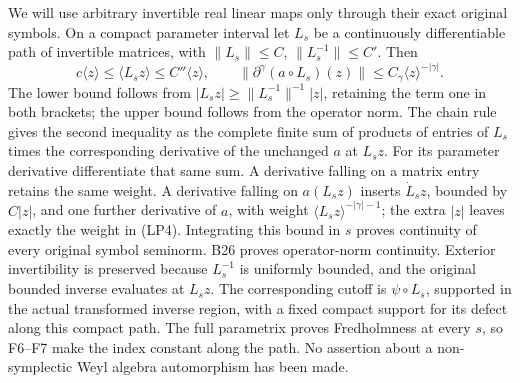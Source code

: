 \documentclass[
  11pt,
]{article}
\begin{document}
We will use arbitrary invertible real linear maps only through their
exact original symbols. On a compact parameter interval let \(L_s\) be a
continuously differentiable path of invertible matrices, with
\(\|L_s\|\le C\), \(\|L_s^{-1}\|\le C'\). Then \[
 c\langle z\rangle\le\langle L_sz\rangle\le C''\langle z\rangle,
 \qquad
 \|\partial^\gamma(a\circ L_s)(z)\|
       \le C_\gamma\langle z\rangle^{-|\gamma|}.
 \tag{LP4}
\] The lower bound follows from \(|L_sz|\ge\|L_s^{-1}\|^{-1}|z|\),
retaining the term one in both brackets; the upper bound follows from
the operator norm. The chain rule gives the second inequality as the
complete finite sum of products of entries of \(L_s\) times the
corresponding derivative of the unchanged \(a\) at \(L_sz\). For its
parameter derivative differentiate that same sum. A derivative falling
on a matrix entry retains the same weight. A derivative falling on
\(a(L_sz)\) inserts \(\dot L_sz\), bounded by \(C|z|\), and one further
derivative of \(a\), with weight \(\langle L_sz\rangle^{-|\gamma|-1}\);
the extra \(|z|\) leaves exactly the weight in (LP4). Integrating this
bound in \(s\) proves continuity of every original symbol seminorm. B26
proves operator-norm continuity. Exterior invertibility is preserved
because \(L_s^{-1}\) is uniformly bounded, and the original bounded
inverse evaluates at \(L_sz\). The corresponding cutoff is
\(\psi\circ L_s\), supported in the actual transformed inverse region,
with a fixed compact support for its defect along this compact path. The
full parametrix proves Fredholmness at every \(s\), so F6--F7 make the
index constant along the path. No assertion about a non-symplectic Weyl
algebra automorphism has been made.
\end{document}
